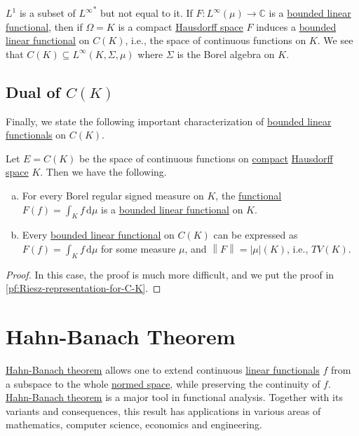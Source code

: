 \begin{remark}
	\(L^1\) is a subset of \({L^{\infty}}^{\ast}\) but not equal to it. If \(F\colon L^{\infty} (\mu )\to \mathbb{C} \) is a \hyperref[def:bounded-linear-functional]{bounded linear functional}, then if \(\Omega = K\) is a compact \hyperref[def:Hausdorff]{Hausdorff space}  \(F\) induces a \hyperref[def:bounded-linear-functional]{bounded linear functional} on \(C(K)\), i.e., the space of continuous functions on \(K\). We see that \(C(K)\subseteq L^{\infty} (K, \Sigma , \mu )\) where \(\Sigma \) is the Borel algebra on \(K\).
\end{remark}

\subsection{Dual of \(C(K)\)}
Finally, we state the following important characterization of \hyperref[def:bounded-linear-functional]{bounded linear functionals} on \(C(K)\).

\begin{theorem}\label{thm:Riesz-representation-for-C-K}
	Let \(E = C(K)\) be the space of continuous functions on \hyperref[def:compact]{compact} \hyperref[def:Hausdorff]{Hausdorff space} \(K\). Then we have the following.
	\begin{enumerate}[(a)]
		\item For every Borel regular signed measure on \(K\), the \hyperref[def:linear-functional]{functional} \(F(f) = \int _K f\,\mathrm{d} \mu \) is a \hyperref[def:bounded-linear-functional]{bounded linear functional} on \(K\).
		\item Every \hyperref[def:bounded-linear-functional]{bounded linear functional} on \(C(K)\) can be expressed as \(F(f) = \int _K f\,\mathrm{d} \mu \) for some measure \(\mu \), and \(\left\lVert F\right\rVert = \left\vert \mu  \right\vert (K) \), i.e., \(TV(K)\).
	\end{enumerate}
\end{theorem}
\begin{proof}
	In this case, the proof is much more difficult, and we put the proof in \autoref{pf:Riesz-representation-for-C-K}.
\end{proof}

\section{Hahn-Banach Theorem}
\hyperref[thm:Hahn-Banach]{Hahn-Banach theorem} allows one to extend continuous \hyperref[def:linear-functional]{linear functionals} \(f\) from a subspace to the whole \hyperref[def:normed-vector-space]{normed space}, while preserving the continuity of \(f\). \hyperref[thm:Hahn-Banach]{Hahn-Banach theorem} is a major tool in functional analysis. Together with its variants and consequences, this result has applications in various areas of mathematics, computer science, economics and engineering.

